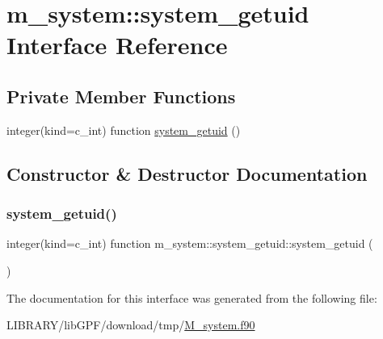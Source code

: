 \hypertarget{interfacem__system_1_1system__getuid}{}\section{m\+\_\+system\+:\+:system\+\_\+getuid Interface Reference}
\label{interfacem__system_1_1system__getuid}
\subsection*{Private Member Functions}
\begin{DoxyCompactItemize}
\item 
integer(kind=c\+\_\+int) function \hyperlink{interfacem__system_1_1system__getuid_adb2147a5c9768d09bd7741b07f02af05}{system\+\_\+getuid} ()
\end{DoxyCompactItemize}


\subsection{Constructor \& Destructor Documentation}
\mbox{\label{interfacem__system_1_1system__getuid_adb2147a5c9768d09bd7741b07f02af05}} 
\subsubsection{\texorpdfstring{system\+\_\+getuid()}{system\_getuid()}}
{\footnotesize\ttfamily integer(kind=c\+\_\+int) function m\+\_\+system\+::system\+\_\+getuid\+::system\+\_\+getuid (\begin{DoxyParamCaption}{ }\end{DoxyParamCaption})\hspace{0.3cm}{\ttfamily [private]}}



The documentation for this interface was generated from the following file\+:\begin{DoxyCompactItemize}
\item 
L\+I\+B\+R\+A\+R\+Y/lib\+G\+P\+F/download/tmp/\hyperlink{M__system_8f90}{M\+\_\+system.\+f90}\end{DoxyCompactItemize}
